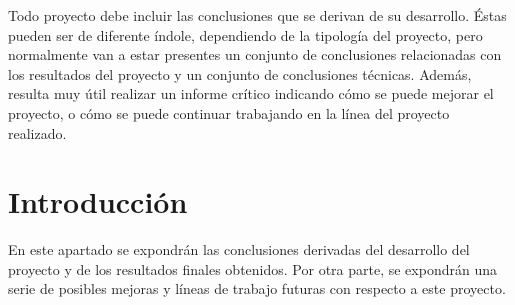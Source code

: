 
Todo proyecto debe incluir las conclusiones que se derivan de su desarrollo. Éstas pueden ser de diferente índole, dependiendo de la tipología del proyecto, pero normalmente van a estar presentes un conjunto de conclusiones relacionadas con los resultados del proyecto y un conjunto de conclusiones técnicas. 
Además, resulta muy útil realizar un informe crítico indicando cómo se puede mejorar el proyecto, o cómo se puede continuar trabajando en la línea del proyecto realizado. 
\section{Introducción}
En este apartado se expondrán las conclusiones derivadas del desarrollo del proyecto y de los resultados finales obtenidos. Por otra parte, se expondrán una serie de posibles mejoras y líneas de trabajo futuras con respecto a este proyecto.

